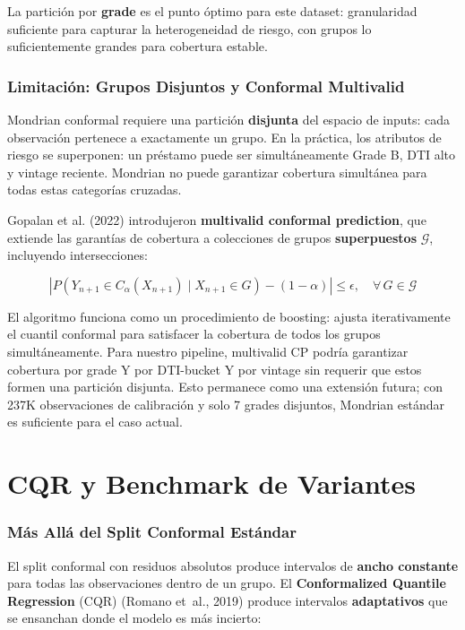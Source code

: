 \documentclass[
  spanish,
  11pt,
  letterpaper,
]{scrbook}
\theoremstyle{plain}
\theoremstyle{remark}
\begin{document}
La partición por \textbf{grade} es el punto óptimo para este dataset:
granularidad suficiente para capturar la heterogeneidad de riesgo, con
grupos lo suficientemente grandes para cobertura estable.

\subsection{Limitación: Grupos Disjuntos y Conformal
Multivalid}\label{limitaciuxf3n-grupos-disjuntos-y-conformal-multivalid}

Mondrian conformal requiere una partición \textbf{disjunta} del espacio
de inputs: cada observación pertenece a exactamente un grupo. En la
práctica, los atributos de riesgo se superponen: un préstamo puede ser
simultáneamente Grade B, DTI alto y vintage reciente. Mondrian no puede
garantizar cobertura simultánea para todas estas categorías cruzadas.

Gopalan et al. (2022) introdujeron \textbf{multivalid conformal
prediction}, que extiende las garantías de cobertura a colecciones de
grupos \textbf{superpuestos} \(\mathcal{G}\), incluyendo intersecciones:

\[
\left| P\left(Y_{n+1} \in C_\alpha(X_{n+1}) \mid X_{n+1} \in G\right) - (1 - \alpha) \right| \leq \epsilon, \quad \forall\, G \in \mathcal{G}
\]

El algoritmo funciona como un procedimiento de boosting: ajusta
iterativamente el cuantil conformal para satisfacer la cobertura de
todos los grupos simultáneamente. Para nuestro pipeline, multivalid CP
podría garantizar cobertura por grade Y por DTI-bucket Y por vintage sin
requerir que estos formen una partición disjunta. Esto permanece como
una extensión futura; con 237K observaciones de calibración y solo 7
grades disjuntos, Mondrian estándar es suficiente para el caso actual.

\chapter{CQR y Benchmark de Variantes}\label{sec-cqr-variants}

\subsection{Más Allá del Split Conformal
Estándar}\label{muxe1s-alluxe1-del-split-conformal-estuxe1ndar}

El split conformal con residuos absolutos produce intervalos de
\textbf{ancho constante} para todas las observaciones dentro de un
grupo. El \textbf{Conformalized Quantile Regression} (CQR) (Romano
et~al., 2019) produce intervalos \textbf{adaptativos} que se ensanchan
donde el modelo es más incierto:
\end{document}
